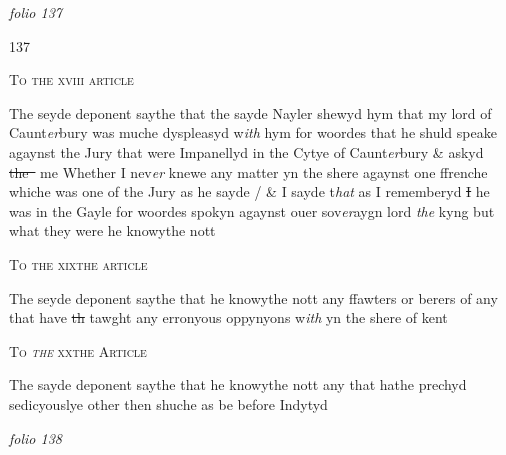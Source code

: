 \documentclass[12pt, a4paper]{book}
\begin{document}
\textit{folio 137}


\begin{flushright}{\color{Mahogany}137}\end{flushright}
 	
 		
				\begin{center}  {\scshape To the xviii article}  \end{center}
			
 		
		\ifthenelse{\isodd{\thepage}}
		{\reversemarginpar}
		{\normalmarginpar}
		The seyde deponent saythe that the sayde Nayler shewyd  hym that my lord of Caunt\textit{er}bury was muche dyspleasyd w\textit{ith} hym for woordes that he shuld speake agaynst the Jury that were Impanellyd in the Cytye of Caunt\textit{er}bury \& askyd  \sout{the } me Whether I nev\textit{er} knewe any matter yn the shere agaynst one ffrenche whiche was one of the Jury as he sayde
			 / \& I sayde t\textit{hat} as I rememberyd \sout{I } he was in the Gayle for woordes spokyn agaynst ouer sov\textit{er}aygn lord \textit{the} kyng but what they were he knowythe nott
 	
 	
 		
				\begin{center}  {\scshape To the xixthe article}  \end{center}
			
 	
		\ifthenelse{\isodd{\thepage}}
		{\reversemarginpar}
		{\normalmarginpar}
		The seyde deponent saythe that he knowythe nott any ffawters or berers of any that have \sout{th }tawght any erronyous oppynyons w\textit{ith} yn the shere of kent 
 	
 	
 		
				\begin{center}  {\scshape To \textit{the} xxthe Article }  \end{center}
			
 		
		\ifthenelse{\isodd{\thepage}}
		{\reversemarginpar}
		{\normalmarginpar}
		The sayde deponent saythe that he knowythe nott any that hathe prechyd sedicyouslye other then shuche as be before Indytyd
 	

\dotfill
					

\textit{folio 138}


         \vspace{4cm}
         
\dotfill
					
\end{document}
